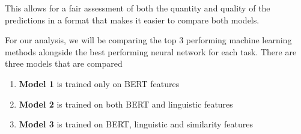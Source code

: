 \documentclass{article}
\begin{document}
This allows for a fair assessment of both the quantity and quality of the predictions in a format that makes it easier to compare both models.

\label{section:results-discussion}

For our analysis, we will be comparing the top 3 performing machine learning methods alongside the best performing neural network for each task. There are three models that are compared

\begin{enumerate}
  \item \textbf{Model 1} is trained only on BERT features
  \item \textbf{Model 2} is trained on both BERT and linguistic features
  \item \textbf{Model 3} is trained on BERT, linguistic and similarity features
\end{enumerate}
\end{document}
